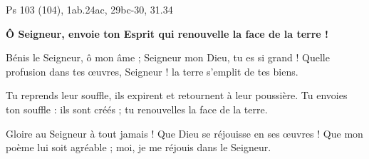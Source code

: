 Ps 103 (104), 1ab.24ac, 29bc-30, 31.34

\textbf{ Ô Seigneur, envoie ton Esprit qui renouvelle la face de la terre !}

Bénis le Seigneur, ô mon âme ;
Seigneur mon Dieu, tu es si grand !
Quelle profusion dans tes œuvres, Seigneur !
la terre s’emplit de tes biens.

Tu reprends leur souffle, ils expirent
et retournent à leur poussière.
Tu envoies ton souffle : ils sont créés ;
tu renouvelles la face de la terre.

Gloire au Seigneur à tout jamais !
Que Dieu se réjouisse en ses œuvres !
Que mon poème lui soit agréable ;
moi, je me réjouis dans le Seigneur.
